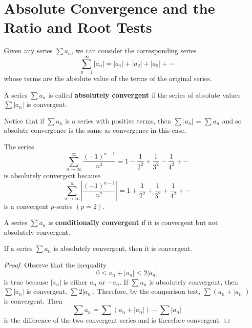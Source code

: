 \section{Absolute Convergence and the Ratio and Root Tests}
  Given any series $\sum a_n$, we can consider the corresponding series
  $$ \sum_{n=1}^{\infty} |a_n| = |a_1|+|a_2|+|a_3|+\cdots$$
  whose terms are the absolute value of the terms of the original series.
  \begin{definition}
    A series $\sum a_n$ is called \textbf{absolutely convergent} if the series of absolute values $\sum |a_n|$ is convergent.
  \end{definition}
  Notice that if $\sum a_n$ is a series with positive terms, then $\sum |a_n|$ = $\sum a_n$ and so absolute convergence is the same as convergence in this case.
  \begin{example}
    The series
    $$ \sum_{n\to\infty}^{\infty} \frac{(-1)^{n-1}}{n^2} = 1 - \frac{1}{2^2} + \frac{1}{3^2} - \frac{1}{4^2} + \cdots$$
    is absolutely convergent because
    $$ \sum_{n\to\infty}^{\infty} \left|\frac{(-1)^{n-1}}{n^2}\right| = 1 + \frac{1}{2^2} + \frac{1}{3^2} + \frac{1}{4^2} + \cdots$$
     is a convergent $p$-series $(p=2)$.
  \end{example}
  \begin{definition}
    A series $\sum a_n$ is \textbf{conditionally convergent} if it is convergent but not absolutely convergent.
  \end{definition}
  \begin{definition}
    If a series $\sum a_n$ is absolutely convergent, then it is convergent.
  \end{definition}
  \begin{proof}\let\qed\relax
    Observe that the inequality $$0 \leq a_n + |a_n| \leq 2|a_n|$$ is true because $|a_n|$ is either $a_n$ or $-a_n$. If $\sum a_n$ is absolutely convergent, then $\sum |a_n|$ is convergent, $\sum 2|a_n|$. Therefore, by the comparison test, $\sum (a_n + |a_n|)$ is convergent. Then $$\sum a_n = \sum (a_n + |a_n|) - \sum |a_n|$$ is the difference of the two convergent series and is therefore convergent.
  \end{proof}
